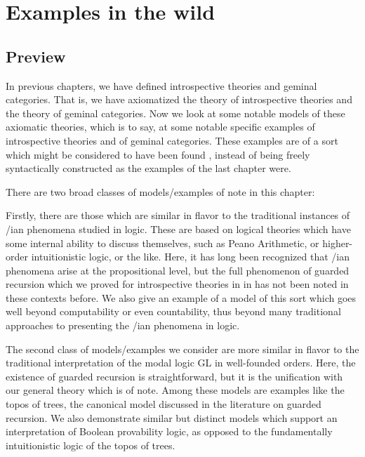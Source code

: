 \filestart

\section{Examples in the wild}

\subsection{Preview}
In previous chapters, we have defined introspective theories and geminal categories. That is, we have axiomatized the theory of introspective theories and the theory of geminal categories. Now we look at some notable models of these axiomatic theories, which is to say, at some notable specific examples of introspective theories and of geminal categories. These examples are of a sort which might be considered to have been found , instead of being freely syntactically constructed as the examples of the last chapter were.

There are two broad classes of models/examples of note in this chapter:

Firstly, there are those which are similar in flavor to the traditional instances of \Goedel/ian phenomena studied in logic. These are based on logical theories which have some internal ability to discuss themselves, such as Peano Arithmetic, or higher-order intuitionistic logic, or the like. Here, it has long been recognized that \Goedel/ian phenomena arise at the propositional level, but the full phenomenon of guarded recursion which we proved for introspective theories in \TODO in has not been noted in these contexts before. We also give an example of a model of this sort which goes well beyond computability or even countability, thus beyond many traditional approaches to presenting the \Goedel/ian phenomena in logic.

The second class of models/examples we consider are more similar in flavor to the traditional interpretation of the modal logic GL in well-founded orders. Here, the existence of guarded recursion is straightforward, but it is the unification with our general theory which is of note. Among these models are examples like the topos of trees, the canonical model discussed in the literature on guarded recursion. We also demonstrate similar but distinct models which support an interpretation of Boolean provability logic, as opposed to the fundamentally intuitionistic logic of the topos of trees.

